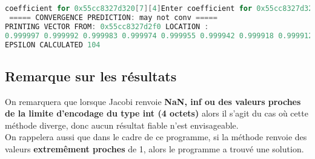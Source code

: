 \begin{lstlisting}[language=C,inputencoding=utf8, basicstyle=\fontsize{8}{10}\selectfont,caption=Execution with A6 dimensions: 10x10]
coefficient for 0x55cc8327d320[7][4]Enter coefficient for 0x55cc8327d320[7][5]Enter coefficient for 0x55cc8327d320[7][6]Enter coefficient for 0x55cc8327d320[7][7]Enter coefficient for 0x55cc8327d320[7][8]Enter coefficient for 0x55cc8327d320[7][9]Enter coefficient for 0x55cc8327d320[8][0]Enter coefficient for 0x55cc8327d320[8][1]Enter coefficient for 0x55cc8327d320[8][2]Enter coefficient for 0x55cc8327d320[8][3]Enter coefficient for 0x55cc8327d320[8][4]Enter coefficient for 0x55cc8327d320[8][5]Enter coefficient for 0x55cc8327d320[8][6]Enter coefficient for 0x55cc8327d320[8][7]Enter coefficient for 0x55cc8327d320[8][8]Enter coefficient for 0x55cc8327d320[8][9]Enter coefficient for 0x55cc8327d320[9][0]Enter coefficient for 0x55cc8327d320[9][1]Enter coefficient for 0x55cc8327d320[9][2]Enter coefficient for 0x55cc8327d320[9][3]Enter coefficient for 0x55cc8327d320[9][4]Enter coefficient for 0x55cc8327d320[9][5]Enter coefficient for 0x55cc8327d320[9][6]Enter coefficient for 0x55cc8327d320[9][7]Enter coefficient for 0x55cc8327d320[9][8]Enter coefficient for 0x55cc8327d320[9][9]
 ===== CONVERGENCE PREDICTION: may not conv =====
PRINTING VECTOR FROM: 0x55cc8327d2f0 LOCATION :
0.999997 0.999992 0.999983 0.999974 0.999955 0.999942 0.999918 0.999912 0.999902 0.999934
EPSILON CALCULATED 104
\end{lstlisting}
\subsection{Remarque sur les résultats}
On remarquera que lorsque Jacobi renvoie \textbf{NaN, inf ou des valeurs proches de la limite d'encodage du type int (4 octets)} alors il s'agit du cas où cette méthode diverge, donc aucun résultat fiable n'est envisageable.\\
On rappelera aussi que dans le cadre de ce programme, si la méthode renvoie des valeurs \textbf{extremêment proches} de 1, alors le programme a trouvé une solution. 
